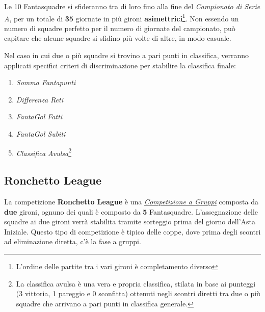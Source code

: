 \documentclass[12pt]{article}
\begin{document}
Le 10 Fantasquadre si sfideranno tra di loro fino alla fine del \textit{Campionato di Serie A}, per un totale di \textbf{35} giornate in più gironi \textbf{asimettrici}\footnote{L’ordine delle partite tra i vari gironi è completamento diverso}. 
Non essendo un numero di squadre perfetto per il numero di giornate del campionato, può capitare che alcune squadre si sfidino più volte di altre, in modo casuale.

Nel caso in cui due o più squadre si trovino a pari punti in classifica, verranno applicati specifici criteri di discriminazione per stabilire la classifica finale:

\begin{enumerate}
    \item \textit{Somma Fantapunti}
    \item \textit{Differenza Reti}
    \item \textit{FantaGol Fatti}
    \item \textit{FantaGol Subiti}
    \item \textit{Classifica Avulsa}\footnote{La classifica avulsa è una vera e propria classifica, stilata in base ai punteggi (3 vittoria, 1 pareggio e 0 sconfitta) ottenuti negli scontri diretti tra due o più squadre che arrivano a pari punti in classifica generale.}
\end{enumerate}
\subsection{Ronchetto League}
La competizione \textbf{Ronchetto League} è una \textit{\hyperref[competizione-a-gruppi]{Competizione a Gruppi}} composta da \textbf{due} gironi, ognuno dei quali è composto da \textbf{5} Fantasquadre. L'assegnazione delle squadre ai due gironi verrà stabilita tramite sorteggio prima del giorno dell'Asta Iniziale. Questo tipo di competizione è tipico delle coppe, dove prima degli scontri ad eliminazione diretta, c'è la fase a gruppi.
\end{document}
